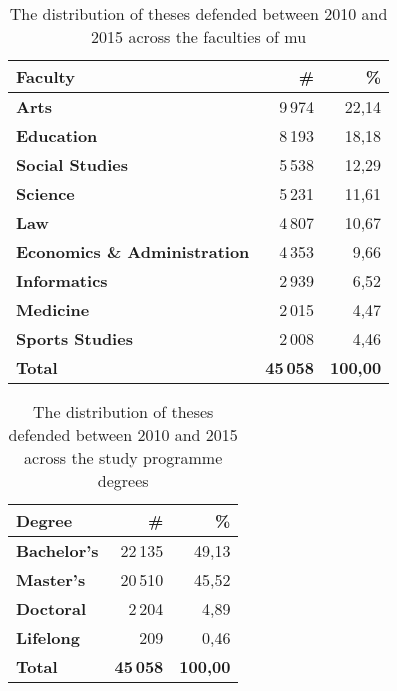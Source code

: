   \begin{table}
    \begin{tabularx}{\textwidth}{Xrr}
      \textbf{Faculty} & \textbf{\#} & \textbf{\%} \\
      \hline
      \textbf{Arts}                         & 9\,974        & 22,14 \\%
      \textbf{Education}                    & 8\,193        & 18,18 \\%
      \textbf{Social Studies}               & 5\,538        & 12,29 \\%
      \textbf{Science}                      & 5\,231        & 11,61 \\%
      \textbf{Law}                          & 4\,807        & 10,67 \\%
      \textbf{Economics \& Administration}  & 4\,353        &  9,66 \\%
      \textbf{Informatics}                  & 2\,939        &  6,52 \\%
      \textbf{Medicine}                     & 2\,015        &  4,47 \\%
      \textbf{Sports Studies}               & 2\,008        &  4,46 \\%
      \hline
      \textbf{Total}                        & \textbf{45\,058} & \textbf{100,00}
    \end{tabularx}
    \caption{The distribution of theses defended between 2010 and 2015 across the faculties of \gls{mu}}
    \label{table:statistics-faculty}
  \end{table}

  \begin{table}
    \begin{tabularx}{\textwidth}{Xrr}
      \textbf{Degree} & \textbf{\#} & \textbf{\%} \\
      \hline
      \textbf{Bachelor's} & 22\,135 & 49,13 \\
      \textbf{Master's}   & 20\,510 & 45,52 \\
      \textbf{Doctoral}   &  2\,204 &  4,89 \\
      \textbf{Lifelong}   &     209 &  0,46 \\
      \hline
      \textbf{Total}      & \textbf{45\,058} & \textbf{100,00}
    \end{tabularx}
    \caption{The distribution of theses defended between 2010 and 2015 across the study programme degrees}
    \label{table:statistics-degree}
  \end{table}
  
